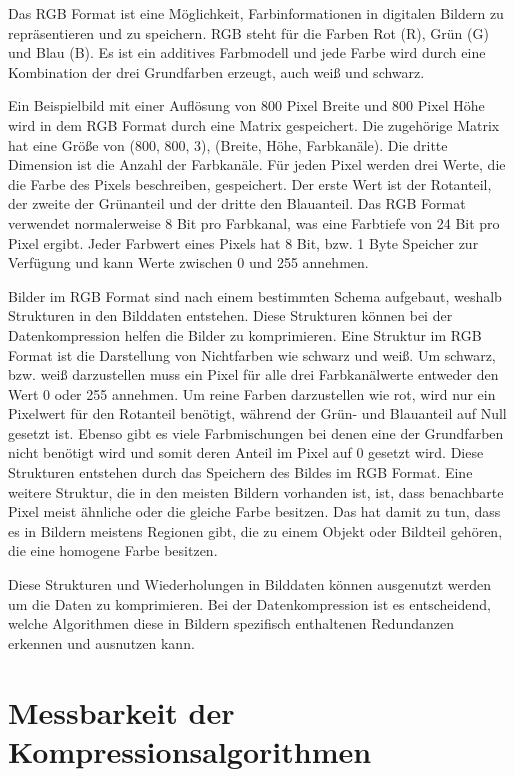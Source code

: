 \documentclass[conference]{IEEEtran}
\begin{document}
Das RGB Format ist eine Möglichkeit, Farbinformationen in digitalen Bildern zu
repräsentieren und zu speichern.
RGB steht für die Farben Rot (R), Grün (G) und Blau (B).
Es ist ein additives Farbmodell und jede Farbe wird durch eine Kombination
der drei Grundfarben erzeugt, auch weiß und schwarz. \cite{rite}

Ein Beispielbild mit einer Auflösung von 800 Pixel Breite und 800 Pixel Höhe wird in
dem RGB Format durch eine Matrix gespeichert.
Die zugehörige Matrix hat eine Größe von (800, 800, 3), (Breite, Höhe, Farbkanäle).
Die dritte Dimension ist die Anzahl der Farbkanäle.
Für jeden Pixel werden drei Werte, die die Farbe des Pixels beschreiben, gespeichert.
Der erste Wert ist der Rotanteil, der zweite der Grünanteil und der dritte
den Blauanteil.
Das RGB Format verwendet normalerweise 8 Bit pro Farbkanal, was eine Farbtiefe von
24 Bit pro Pixel ergibt.
Jeder Farbwert eines Pixels hat 8 Bit, bzw. 1 Byte Speicher zur Verfügung und kann
Werte zwischen 0 und 255 annehmen.

Bilder im RGB Format sind nach einem bestimmten Schema aufgebaut, weshalb
Strukturen in den Bilddaten entstehen.
Diese Strukturen können bei der Datenkompression helfen die Bilder zu komprimieren.
Eine Struktur im RGB Format ist die Darstellung von Nichtfarben
wie schwarz und weiß.
Um schwarz, bzw. weiß darzustellen muss ein Pixel für alle drei Farbkanälwerte entweder
den Wert 0 oder 255 annehmen.
Um reine Farben darzustellen wie rot, wird nur ein Pixelwert für den Rotanteil
benötigt, während der Grün- und Blauanteil auf Null gesetzt ist.
Ebenso gibt es viele Farbmischungen bei denen eine der Grundfarben nicht benötigt
wird und somit deren Anteil im Pixel auf 0 gesetzt wird.
Diese Strukturen entstehen durch das Speichern des Bildes im RGB Format.
Eine weitere Struktur, die in den meisten Bildern vorhanden ist, ist, dass benachbarte
Pixel meist ähnliche oder die gleiche Farbe besitzen.
Das hat damit zu tun, dass es in Bildern meistens Regionen gibt, die zu einem
Objekt oder Bildteil gehören, die eine homogene Farbe besitzen.

Diese Strukturen und Wiederholungen in Bilddaten können ausgenutzt werden um die
Daten zu komprimieren.
Bei der Datenkompression ist es entscheidend, welche Algorithmen diese in Bildern
spezifisch enthaltenen Redundanzen erkennen und ausnutzen kann.



\section{Messbarkeit der Kompressionsalgorithmen}
\end{document}
